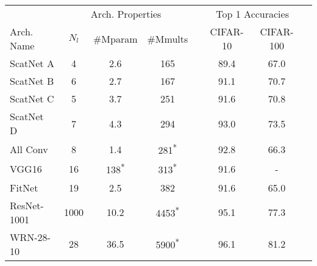 \begin{table}
  \renewcommand{\arraystretch}{1.2}
  \centering
  \label{tab:hybrid_scat}
  \hspace{-10pt}
  \begin{tabular}{@{}lccccccc@{}}
    \toprule
    & \multicolumn{3}{c}{Arch. Properties} && \multicolumn{2}{c}{Top 1 Accuracies} \\\cline{2-4}\cline{6-7}
    Arch. Name \phantom{abcde} & $N_l$ &\#Mparam &\#Mmults&\phantom{ab}&CIFAR-10&CIFAR-100\\ \midrule
    ScatNet A & 4 & 2.6 & 165 && 89.4 & 67.0 \\ 
    ScatNet B & 6 & 2.7 & 167 && 91.1  & 70.7 \\ %
    ScatNet C & 5 & 3.7 & 251 && 91.6 & 70.8  \\ %
    ScatNet D & 7 & 4.3 & 294 && 93.0 & 73.5  \\\hline %
    All Conv\cite{springenberg_striving_2014-3} & 8 & 1.4 & 281\textsuperscript{*} && 92.8 & 66.3 \\ %
    VGG16\cite{liu_very_2015} & 16 & 138\textsuperscript{*} & 313\textsuperscript{*}  && 91.6 & -  \\ 
    FitNet\cite{romero_fitnets:_2014} & 19 & 2.5 & 382 && 91.6 & 65.0 \\ %
    ResNet-1001\cite{he_identity_2016} & 1000 & 10.2 & 4453\textsuperscript{*}&& 95.1 & 77.3 \\ %
    WRN-28-10\cite{zagoruyko_wide_2016} & 28 & 36.5 & 5900\textsuperscript{*} && 96.1 & 81.2 \\ %
    \bottomrule
  \end{tabular}
\end{table}

